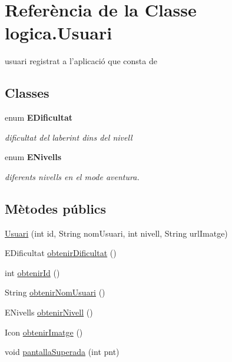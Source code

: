 \hypertarget{classlogica_1_1_usuari}{\section{Referència de la Classe logica.\+Usuari}
\label{classlogica_1_1_usuari}
}


usuari registrat a l'aplicació que consta de  


\subsection*{Classes}
\begin{DoxyCompactItemize}
\item 
enum {\bfseries E\+Dificultat}
\begin{DoxyCompactList}\small\item\em dificultat del laberint dins del nivell \end{DoxyCompactList}\item 
enum {\bfseries E\+Nivells}
\begin{DoxyCompactList}\small\item\em diferents nivells en el mode aventura. \end{DoxyCompactList}\end{DoxyCompactItemize}
\subsection*{Mètodes públics}
\begin{DoxyCompactItemize}
\item 
\hyperlink{classlogica_1_1_usuari_a7d61fbf17076f5c75841d30598ee3289}{Usuari} (int id, String nom\+Usuari, int nivell, String url\+Imatge)
\item 
E\+Dificultat \hyperlink{classlogica_1_1_usuari_a8aaddefb9f6dba6e142426483ade785f}{obtenir\+Dificultat} ()
\item 
int \hyperlink{classlogica_1_1_usuari_a47de68f8f3a0a5c45352b0f93cb0d156}{obtenir\+Id} ()
\item 
String \hyperlink{classlogica_1_1_usuari_a642304fd209679e1cd3f312eaa06ed9c}{obtenir\+Nom\+Usuari} ()
\item 
E\+Nivells \hyperlink{classlogica_1_1_usuari_a1af8cdd311f23f556295912d869c1630}{obtenir\+Nivell} ()
\item 
Icon \hyperlink{classlogica_1_1_usuari_aa1f96063a4d6a068e2088e6f7339a4fa}{obtenir\+Imatge} ()
\item 
void \hyperlink{classlogica_1_1_usuari_a3d2c12a1138df467863c3ff43827bed1}{pantalla\+Superada} (int pnt)
\end{DoxyCompactItemize}


